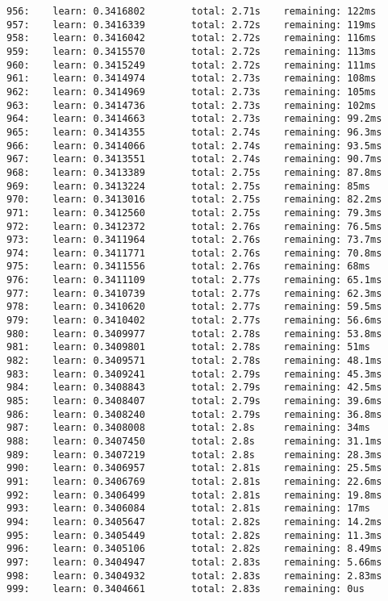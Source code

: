 \documentclass[11pt]{article}
\begin{document}
\begin{Verbatim}[commandchars=\\\{\}]
956:    learn: 0.3416802        total: 2.71s    remaining: 122ms
957:    learn: 0.3416339        total: 2.72s    remaining: 119ms
958:    learn: 0.3416042        total: 2.72s    remaining: 116ms
959:    learn: 0.3415570        total: 2.72s    remaining: 113ms
960:    learn: 0.3415249        total: 2.72s    remaining: 111ms
961:    learn: 0.3414974        total: 2.73s    remaining: 108ms
962:    learn: 0.3414969        total: 2.73s    remaining: 105ms
963:    learn: 0.3414736        total: 2.73s    remaining: 102ms
964:    learn: 0.3414663        total: 2.73s    remaining: 99.2ms
965:    learn: 0.3414355        total: 2.74s    remaining: 96.3ms
966:    learn: 0.3414066        total: 2.74s    remaining: 93.5ms
967:    learn: 0.3413551        total: 2.74s    remaining: 90.7ms
968:    learn: 0.3413389        total: 2.75s    remaining: 87.8ms
969:    learn: 0.3413224        total: 2.75s    remaining: 85ms
970:    learn: 0.3413016        total: 2.75s    remaining: 82.2ms
971:    learn: 0.3412560        total: 2.75s    remaining: 79.3ms
972:    learn: 0.3412372        total: 2.76s    remaining: 76.5ms
973:    learn: 0.3411964        total: 2.76s    remaining: 73.7ms
974:    learn: 0.3411771        total: 2.76s    remaining: 70.8ms
975:    learn: 0.3411556        total: 2.76s    remaining: 68ms
976:    learn: 0.3411109        total: 2.77s    remaining: 65.1ms
977:    learn: 0.3410739        total: 2.77s    remaining: 62.3ms
978:    learn: 0.3410620        total: 2.77s    remaining: 59.5ms
979:    learn: 0.3410402        total: 2.77s    remaining: 56.6ms
980:    learn: 0.3409977        total: 2.78s    remaining: 53.8ms
981:    learn: 0.3409801        total: 2.78s    remaining: 51ms
982:    learn: 0.3409571        total: 2.78s    remaining: 48.1ms
983:    learn: 0.3409241        total: 2.79s    remaining: 45.3ms
984:    learn: 0.3408843        total: 2.79s    remaining: 42.5ms
985:    learn: 0.3408407        total: 2.79s    remaining: 39.6ms
986:    learn: 0.3408240        total: 2.79s    remaining: 36.8ms
987:    learn: 0.3408008        total: 2.8s     remaining: 34ms
988:    learn: 0.3407450        total: 2.8s     remaining: 31.1ms
989:    learn: 0.3407219        total: 2.8s     remaining: 28.3ms
990:    learn: 0.3406957        total: 2.81s    remaining: 25.5ms
991:    learn: 0.3406769        total: 2.81s    remaining: 22.6ms
992:    learn: 0.3406499        total: 2.81s    remaining: 19.8ms
993:    learn: 0.3406084        total: 2.81s    remaining: 17ms
994:    learn: 0.3405647        total: 2.82s    remaining: 14.2ms
995:    learn: 0.3405449        total: 2.82s    remaining: 11.3ms
996:    learn: 0.3405106        total: 2.82s    remaining: 8.49ms
997:    learn: 0.3404947        total: 2.83s    remaining: 5.66ms
998:    learn: 0.3404932        total: 2.83s    remaining: 2.83ms
999:    learn: 0.3404661        total: 2.83s    remaining: 0us
    \end{Verbatim}
\end{document}
